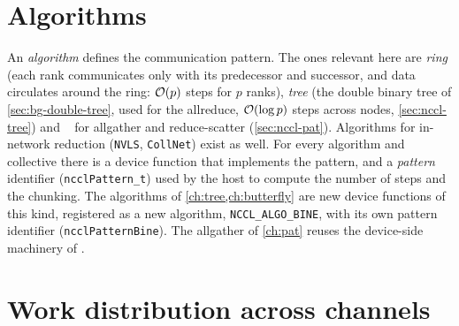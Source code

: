 \section{Algorithms}\label{sec:nccl-algorithms}

An \emph{algorithm} defines the communication pattern.
The ones relevant here are \emph{ring} (each rank communicates only with its predecessor and successor, and data circulates around the ring: $\mathcal{O}\!\left(p\right)$ steps for $p$ ranks), \emph{tree} (the double binary tree of \cref{sec:bg-double-tree}, used for the allreduce, $\mathcal{O}\!\left(\log p\right)$ steps across nodes, \cref{sec:nccl-tree}) and \pat{}~\cite{jeaugey2025pat} for allgather and reduce-scatter (\cref{sec:nccl-pat}).
Algorithms for in-network reduction (\texttt{NVLS}, \texttt{CollNet}) exist as well.
For every algorithm and collective there is a device function that implements the pattern, and a \emph{pattern} identifier (\texttt{ncclPattern\_t}) used by the host to compute the number of steps and the chunking.
The \bine{} algorithms of \cref{ch:tree,ch:butterfly} are new device functions of this kind, registered as a new algorithm, \texttt{NCCL\_ALGO\_BINE}, with its own pattern identifier (\texttt{ncclPatternBine}). The \bine{} allgather of \cref{ch:pat} reuses the device-side machinery of \pat{}.

\section{Work distribution across channels}\label{sec:nccl-distribution}

